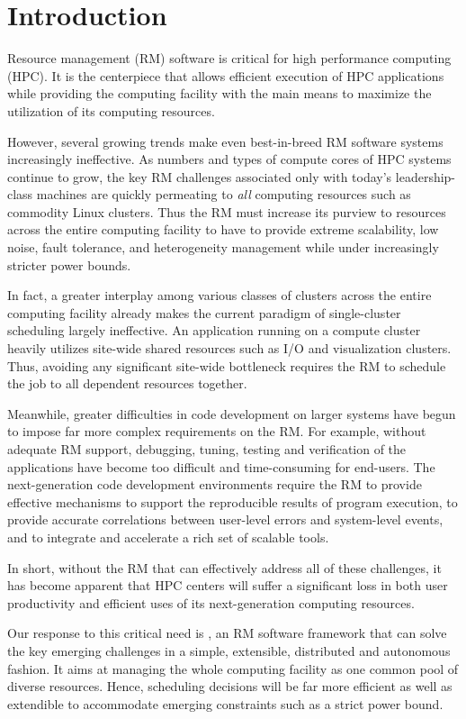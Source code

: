 \section{Introduction}

Resource management (RM) software is critical
for high performance computing (HPC).
It is the centerpiece that allows efficient
execution of HPC applications while providing
the computing facility with the main means
to maximize the utilization of its computing
resources.

However, several growing trends make even
best-in-breed RM software systems increasingly ineffective.
As numbers and types of compute cores of
HPC systems continue to grow, the key RM challenges associated only
with today's leadership-class machines are quickly
permeating to {\em all} computing resources
such as commodity Linux clusters. Thus the RM must increase
its purview to resources across the entire
computing facility to have to provide 
extreme scalability, low noise, fault tolerance,
and heterogeneity management while under increasingly
stricter power bounds.

In fact, a greater interplay among various classes
of clusters across the entire computing facility already 
makes the current paradigm of single-cluster scheduling
largely ineffective. An application running on a compute
cluster heavily utilizes site-wide shared resources
such as I/O and visualization clusters.
Thus, avoiding any significant site-wide bottleneck
requires the RM to schedule the job to all dependent
resources together.

Meanwhile, greater difficulties in code development
on larger systems have begun to impose far more complex
requirements on the RM. For example, without adequate
RM support, debugging, tuning, testing and verification
of the applications have become too difficult
and time-consuming for end-users.
The next-generation code development environments
require the RM to provide effective mechanisms
to support the reproducible results of program execution,
to provide accurate correlations between user-level errors
and system-level events,
and to integrate and accelerate a rich set of scalable tools.

In short, without the RM that can effectively
address all of these challenges, it has become apparent
that HPC centers will suffer a significant loss
in both user productivity and efficient uses of its
next-generation computing resources. 

Our response to this critical need is \flux,
an RM software framework that can solve the key emerging
challenges in a simple, extensible, distributed
and autonomous fashion.
It aims at managing the whole computing facility
as one common pool of diverse resources.
Hence, scheduling decisions will be far more efficient
as well as extendible to accommodate emerging constraints
such as a strict power bound.

